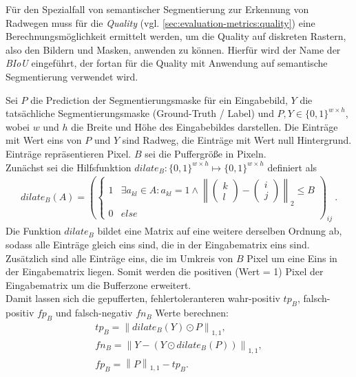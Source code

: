 Für den Spezialfall von semantischer Segmentierung zur Erkennung von Radwegen muss für die \textit{Quality} (vgl. \autoref{sec:evaluation-metrics:quality}) 
eine Berechnungsmöglichkeit ermittelt werden, um die Quality auf diskreten Rastern, also den Bildern und Masken, anwenden zu können.
Hierfür wird der Name der \textit{\acf{BIoU}} eingeführt, der fortan für die Quality mit Anwendung auf semantische Segmentierung verwendet wird.

Sei $P$ die Prediction der Segmentierungsmaske für ein Eingabebild, $Y$ die tatsächliche Segmentierungsmaske (Ground-Truth / Label)
und $P, Y \in \{0, 1\}^{w \times h}$, wobei $w$ und $h$ die Breite und Höhe des Eingabebildes darstellen.
Die Einträge mit Wert eins von $P$ und $Y$ sind Radweg, die Einträge mit Wert null Hintergrund. Einträge repräsentieren Pixel.
$B$ sei die Puffergröße in Pixeln. \\
Zunächst sei die Hilfsfunktion $dilate_B: \{0,1\}^{w \times h} \mapsto \{0,1\}^{w \times h}$ definiert als 
\newcommand{\norm}[1]{\left\lVert#1\right\rVert}
\begin{align}
	\label{eq:dilate} dilate_B(A) = \left( \begin{cases} 
		1 & \exists a_{kl} \in A: a_{kl} = 1 \land \norm{
			\begin{pmatrix} k \\ l \end{pmatrix} - \begin{pmatrix} i \\ j \end{pmatrix} }_2 \leq B \\
		0 & else 
	\end{cases} \right)_{ij}~.
\end{align}
Die Funktion $dilate_B$ bildet eine Matrix auf eine weitere derselben Ordnung ab, 
sodass alle Einträge gleich eins sind, die in der Eingabematrix eins sind. Zusätzlich sind alle Einträge eins, 
die im Umkreis von $B$ Pixel um eine Eins in der Eingabematrix liegen. Somit werden die positiven (Wert = 1)
Pixel der Eingabematrix um die Bufferzone erweitert.  \\
Damit lassen sich die gepufferten, fehlertoleranteren wahr-positiv $tp_B$, falsch-positiv $fp_B$ und 
falsch-negativ $fn_B$ Werte berechnen: 
\begin{align}
	\label{eq:buffering} {tp}_B = \norm{dilate_{B}(Y) \odot P}_{1,1} , \\
	fn_B = \norm{Y - (Y \odot dilate_{B}(P))}_{1,1} , \\
	{fp}_B = \norm{P}_{1,1} - {tp}_B .
\end{align}
